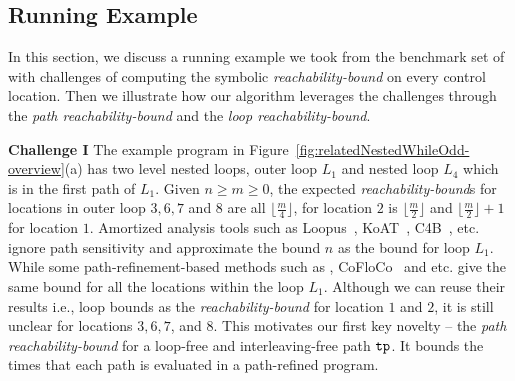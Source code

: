 

\subsection{Running Example}
In this section, we discuss a running example we took from
the benchmark set of~\cite{GulwaniZ10} with
challenges of computing the symbolic
\emph{reachability-bound} on
every control location. Then we illustrate how our algorithm leverages the challenges through the \emph{path reachability-bound} and the \emph{loop reachability-bound}.



\textbf{Challenge I}
The example program in Figure~\ref{fig:relatedNestedWhileOdd-overview}(a) has two level nested loops, outer loop $L_1$ and nested loop $L_4$ which is in the first path of $L_1$. Given $n \geq m \geq 0$,
the expected \emph{reachability-bound}s for locations in outer loop $3, 6, 7$ and $8$ are all $\lfloor\frac{m}{4}\rfloor$,
for location $2$ is $\lfloor\frac{m}{2}\rfloor$ and $\lfloor\frac{m}{2}\rfloor + 1$ for location $1$.
Amortized analysis tools such as Loopus~\cite{SinnZV17}, KoAT~\cite{BrockschmidtEFFG14,FalkeKS12,FalkeKS11}, C4B~\cite{CarbonneauxHS15}, etc. ignore path sensitivity and approximate the bound $n$ as the bound for loop $L_1$. 
While some path-refinement-based methods such as \cite{GulwaniZ10,GulwaniJK09}, CoFloCo~\cite{Montoya17,Flores-Montoya16,Flores-MontoyaH14} and etc. give the same bound for all the locations within the loop $L_1$. 
Although we can reuse their results i.e., loop bounds as the \emph{reachability-bound} for location $1$ and $2$,
it is still unclear for locations $3, 6, 7$, and $8$.
%
This motivates our first key novelty -- the \emph{path reachability-bound}
for a loop-free and interleaving-free path $\mathtt{tp}$.
It bounds the times that each path is evaluated in a path-refined program.


